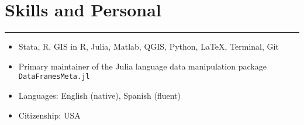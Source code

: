 \documentclass[10pt]{article}
\newenvironment{customitemize}
{ \begin{itemize}[leftmargin=\parindent, topsep = 0.2pt, itemsep = -3pt] }
{\end{itemize} }
\begin{document}
\section*{Skills and Personal}
\noindent \rule{\textwidth}{1pt} 
\begin{customitemize}
	\item Stata, R, GIS in R, Julia, Matlab, QGIS, Python, LaTeX, Terminal, Git
	\item Primary maintainer of the Julia language data manipulation package \texttt{DataFramesMeta.jl} 
	\item Languages: English (native), Spanish (fluent)
	\item Citizenship: USA
\end{customitemize}

\end{document}
